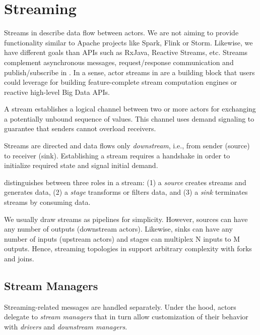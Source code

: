 \section{Streaming\experimental}
\label{streaming}

Streams in \lib describe data flow between actors. We are not aiming to provide
functionality similar to Apache projects like Spark, Flink or Storm. Likewise,
we have different goals than APIs such as RxJava, Reactive Streams, etc.
Streams complement asynchronous messages, request/response communication and
publish/subscribe in \lib. In a sense, actor streams in \lib are a building
block that users could leverage for building feature-complete stream
computation engines or reactive high-level Big Data APIs.

A stream establishes a logical channel between two or more actors for
exchanging a potentially unbound sequence of values. This channel uses demand
signaling to guarantee that senders cannot overload receivers.


Streams are directed and data flows only \emph{downstream}, i.e., from sender
(source) to receiver (sink). Establishing a stream requires a handshake in
order to initialize required state and signal initial demand.


\lib distinguishes between three roles in a stream: (1) a \emph{source} creates
streams and generates data, (2) a \emph{stage} transforms or filters data, and
(3) a \emph{sink} terminates streams by consuming data.

We usually draw streams as pipelines for simplicity. However, sources can have
any number of outputs (downstream actors). Likewise, sinks can have any number
of inputs (upstream actors) and stages can multiplex N inputs to M outputs.
Hence, streaming topologies in \lib support arbitrary complexity with forks and
joins.

\subsection{Stream Managers}

Streaming-related messages are handled separately. Under the hood, actors
delegate to \emph{stream managers} that in turn allow customization of their
behavior with \emph{drivers} and \emph{downstream managers}.



